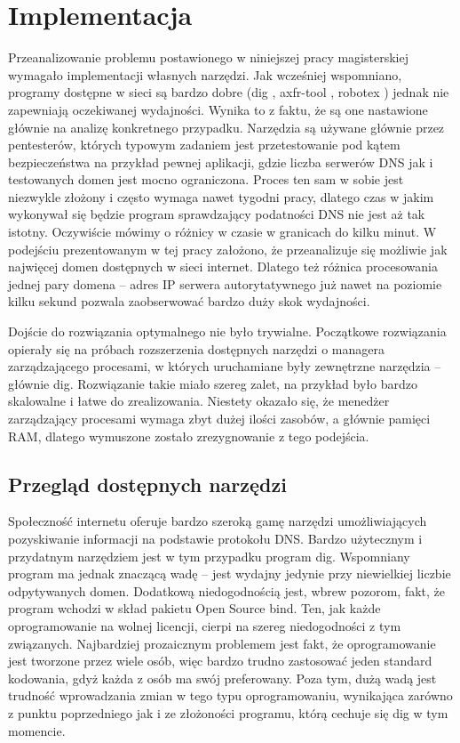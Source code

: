 \chapter{Implementacja}
Przeanalizowanie problemu postawionego w niniejszej pracy magisterskiej wymagało implementacji własnych narzędzi. Jak wcześniej
wspomniano, programy dostępne w sieci są bardzo dobre (dig \cite{dig}, axfr-tool \cite{python_axfr_test}, robotex \cite{robotex})
jednak nie zapewniają oczekiwanej wydajności. Wynika to z faktu, że są one nastawione głównie na analizę konkretnego przypadku.
Narzędzia są używane głównie przez pentesterów, których typowym zadaniem jest przetestowanie pod kątem bezpieczeństwa na przykład pewnej
aplikacji, gdzie liczba serwerów DNS jak i testowanych domen jest mocno ograniczona. Proces ten sam w sobie jest niezwykle złożony
i często wymaga nawet tygodni pracy, dlatego czas w jakim wykonywał się będzie program sprawdzający podatności DNS nie jest aż tak
istotny. Oczywiście mówimy o różnicy w czasie w granicach do kilku minut. W podejściu prezentowanym w tej pracy założono, że
przeanalizuje się możliwie jak najwięcej domen dostępnych w sieci internet. Dlatego też różnica procesowania jednej pary
domena -- adres IP serwera autorytatywnego już nawet na poziomie kilku sekund pozwala zaobserwować bardzo duży skok wydajności.

Dojście do rozwiązania optymalnego nie było trywialne. Początkowe rozwiązania opierały się na próbach rozszerzenia dostępnych
narzędzi o managera
zarządzającego procesami, w których uruchamiane były zewnętrzne narzędzia -- głównie dig. Rozwiązanie takie miało szereg zalet,
na przykład było bardzo skalowalne i łatwe do zrealizowania. Niestety okazało się, że menedżer zarządzający procesami wymaga
zbyt dużej ilości zasobów, a głównie pamięci RAM, dlatego wymuszone zostało zrezygnowanie z tego podejścia.

\section{Przegląd dostępnych narzędzi}
Społeczność internetu oferuje bardzo szeroką gamę narzędzi umożliwiających pozyskiwanie informacji na podstawie protokołu DNS.
Bardzo użytecznym i przydatnym narzędziem jest w tym przypadku program dig. Wspomniany program ma jednak znaczącą wadę -- jest
wydajny jedynie przy niewielkiej liczbie odpytywanych domen. Dodatkową niedogodnością jest, wbrew pozorom, fakt, że program
wchodzi w skład pakietu Open Source bind. Ten, jak każde oprogramowanie na wolnej licencji, cierpi na szereg niedogodności z
tym związanych. Najbardziej prozaicznym problemem jest fakt, że oprogramowanie jest tworzone przez wiele osób, więc bardzo
trudno zastosować jeden standard kodowania, gdyż każda z osób ma swój preferowany. Poza tym, dużą wadą jest trudność wprowadzania
zmian w tego typu oprogramowaniu, wynikająca zarówno z punktu poprzedniego jak i ze złożoności programu, którą cechuje się dig
w tym momencie.

